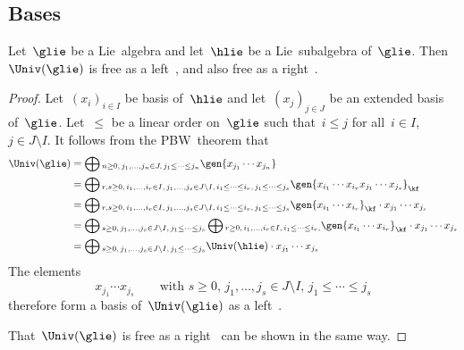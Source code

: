 \subsection*{Bases}

\begin{proposition}
	Let~$\glie$ be a Lie~algebra and let~$\hlie$ be a Lie~subalgebra of~$\glie$.
	Then~$\Univ(\glie)$ is free as a left~\module{$\Univ(\hlie)$}, and also free as a right~\module{$\Univ(\hlie)$}.
\end{proposition}


\begin{proof}
	Let~$(x_i)_{i \in I}$ be basis of~$\hlie$ and let~$(x_j)_{j \in J}$ be an extended basis of~$\glie$.
	Let~$\leq$ be a linear order on~$\glie$ such that~$i \leq j$ for all~$i \in I$,~$j \in J \setminus I$.
	It follows from the PBW~theorem that
	\begin{align*}
		\Univ(\glie)
		&=
		\bigoplus{}_{
			n \geq 0 ,\,
			j_1, \dotsc, j_n \in J,\,
			j_1 \leq \dotsb \leq j_n
		}
		\gen{ x_{j_1} \dotsm x_{j_n} }
		\\
		&=
		\bigoplus{}_{
			r, s \geq 0,\,
			i_1, \dotsc, i_r \in I,\,
			j_1, \dotsc, j_s \in J \setminus I,\,
			i_1 \leq \dotsb \leq i_r,\,
			j_1 \leq \dotsb \leq j_s
		}
		\gen{ x_{i_1} \dotsm x_{i_r} x_{j_1} \dotsm x_{j_s} }_{\kf}
		\\
		&=
		\bigoplus{}_{
			r, s \geq 0,\,
			i_1, \dotsc, i_r \in I,\,
			j_1, \dotsc, j_s \in J \setminus I,\,
			i_1 \leq \dotsb \leq i_r,\,
			j_1 \leq \dotsb \leq j_s
		}
		\gen{ x_{i_1} \dotsm x_{i_r} }_{\kf}
		\cdot x_{j_1} \dotsm x_{j_s}
		\\
		&=
		\bigoplus{}_{
			s \geq 0,\,
			j_1, \dotsc, j_s \in J \setminus I,\,
			j_1 \leq \dotsb \leq j_s
		}
		\bigoplus{}_{
			r \geq 0,\,
			i_1, \dotsc, i_r \in I,\,
			i_1 \leq \dotsb \leq i_r,
		}
		\gen{ x_{i_1} \dotsm x_{i_r} }_{\kf}
		\cdot x_{j_1} \dotsm x_{j_s}
		\\
		&=
		\bigoplus{}_{
			s \geq 0,\,
			j_1, \dotsc, j_s \in J \setminus I,\,
			j_1 \leq \dotsb \leq j_s
		}
		\Univ(\hlie)
		\cdot x_{j_1} \dotsm x_{j_s}
	\end{align*}
	The elements
	\[
		x_{j_1} \dotsm x_{j_s}
		\qquad
		\text{with~$s \geq 0$,~$j_1, \dotsc, j_s \in J \setminus I$,~$j_1 \leq \dotsb \leq j_s$}
	\]
	therefore form a basis of~$\Univ(\glie)$ as a left~\module{$\Univ(\hlie)$}.
	
	That~$\Univ(\glie)$ is free as a right~\module{$\hlie$} can be shown in the same way.
\end{proof}


